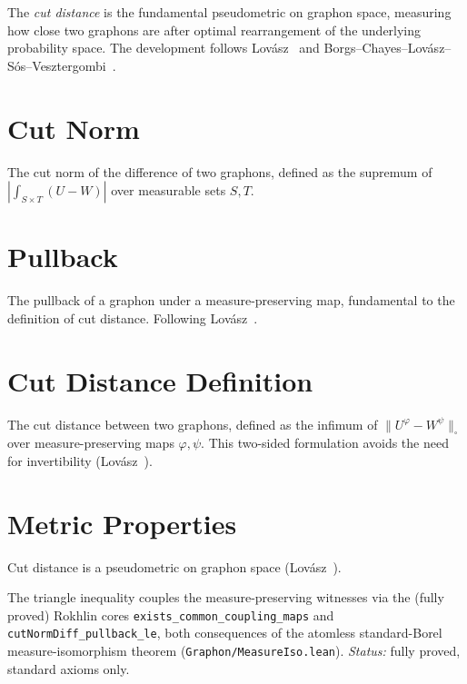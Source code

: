The \emph{cut distance} is the fundamental pseudometric on graphon space, measuring
how close two graphons are after optimal rearrangement of the underlying
probability space.  The development follows
Lov\'asz~\cite[Chapter~8]{lovasz2012} and
Borgs--Chayes--Lov\'asz--S\'os--Vesztergombi~\cite{borgs2008}.

\section{Cut Norm}

The cut norm of the difference of two graphons, defined as the supremum
of $|\int_{S \times T} (U - W)|$ over measurable sets $S, T$.


\section{Pullback}

The pullback of a graphon under a measure-preserving map, fundamental to
the definition of cut distance.  Following
Lov\'asz~\cite[Section~8.2]{lovasz2012}.


\section{Cut Distance Definition}

The cut distance between two graphons, defined as the infimum of
$\|U^\varphi - W^\psi\|_\square$ over measure-preserving maps $\varphi, \psi$.
This two-sided formulation avoids the need for invertibility
(Lov\'asz~\cite[Section~8.2]{lovasz2012}).


\section{Metric Properties}

Cut distance is a pseudometric on graphon space
(Lov\'asz~\cite[Theorem~8.13, Corollary~8.14]{lovasz2012}).




The triangle inequality couples the measure-preserving witnesses via the
(fully proved) Rokhlin cores \texttt{exists\_common\_coupling\_maps} and
\texttt{cutNormDiff\_pullback\_le}, both consequences of the atomless
standard-Borel measure-isomorphism theorem (\texttt{Graphon/MeasureIso.lean}).
\emph{Status:} fully proved, standard axioms only.

